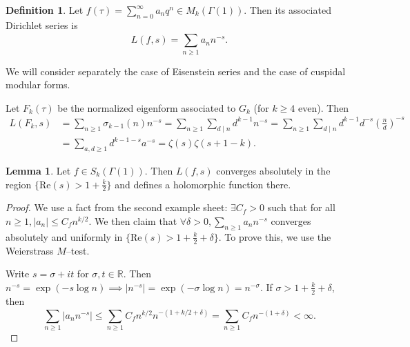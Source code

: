 \documentclass{article}
\theoremstyle{definition}
\newtheorem{lemma}[theorem]{Lemma}
\newtheorem{defn}{Definition}[section]
\begin{document}
\begin{defn}
    Let $f(\tau) = \sum_{n=0}^{\infty} a_nq^n \in M_k(\Gamma(1))$. Then its associated Dirichlet series is  \[
    L(f,s) = \sum_{n\ge 1}^{} a_n n^{-s}.
    \]
\end{defn}
We will consider separately the case of Eisenstein series and the case of cuspidal modular forms. 
\vspace{1mm}
 
Let $F_k(\tau)$ be the normalized eigenform associated to $G_k$ (for $k\ge 4$ even). Then 
\begin{align*}
    L(F_k, s) &= \sum_{n\ge 1}^{} \sigma_{k-1}(n)n^{-s} = \sum_{n\ge 1}^{} \sum_{d \mid n}^{} d^{k-1}n^{-s} = \sum_{n\ge 1}^{} \sum_{ d \mid n}^{} d^{k-1}d^{-s}\left(\frac{n}{d}\right)^{-s} \\
    &= \sum_{a,d \ge 1}^{} d^{k-1-s}a^{-s} = \zeta(s)\zeta(s+1-k).
\end{align*}
\begin{lemma}
    Let $f \in S_k(\Gamma(1))$. Then $L(f,s)$ converges absolutely in the region $\{\text{Re}(s)> 1 + \frac{k}{2}\}$ and defines a holomorphic function there.
\end{lemma}
\begin{proof}
    We use a fact from the second example sheet: $\exists C_f>0$ such that for all $n\ge 1, |a_n|\le C_f n^{k/2}$. We then claim that $\forall \delta>0, \sum_{n\ge 1}^{} a_n n^{-s}$ converges absolutely and uniformly in $\{\text{Re}(s)>1 + \frac{k}{2} + \delta\}$. To prove this, we use the Weierstrass $M$--test.
    \vspace{1mm}
     
    Write $s = \sigma + it$ for $\sigma, t \in \mathbb{R}$. Then $n^{-s} = \exp(-s \log n) \implies |n^{-s}| = \exp(-\sigma \log n) = n^{-\sigma}$. If $\sigma > 1 +\frac{k}{2} + \delta$, then $$\sum_{n\ge 1}^{} |a_n n^{-s}| \le \sum_{n\ge 1}^{} C_f n^{k/2} n^{-(1+k/2+\delta)} = \sum_{n\ge 1}^{} C_f n^{-(1+\delta)}<\infty.$$
\end{proof}
 
\end{document}
